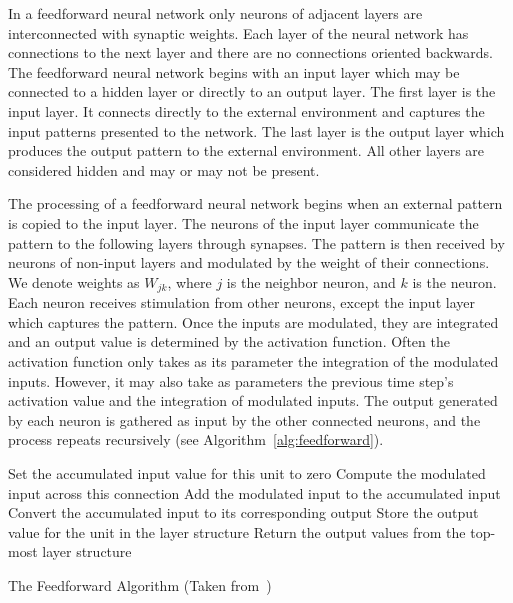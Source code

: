 \documentclass[11pt]{article}
\begin{document}
In a feedforward neural network only neurons of adjacent layers are interconnected with synaptic weights. Each layer of the neural
network has connections to the next layer and there are no connections oriented backwards. The feedforward neural network begins with an
input layer which may be connected to a hidden layer or directly to an output layer. The first layer is the input layer. It connects
directly to the external environment and captures the input patterns presented to the network. The last layer is the output layer which
produces the output pattern to the external environment. All other layers are considered hidden and may or may not be present.

The processing of a feedforward neural network begins when an external pattern is copied to the input layer. The neurons of the input
layer communicate the pattern to the following layers through synapses. The pattern is then received by neurons of non-input layers and
modulated by the weight of their connections. We denote weights as $W_{jk}$, where $j$ is the neighbor neuron, and $k$ is the neuron.
Each neuron receives stimulation from other neurons, except the input layer which captures the pattern. Once the inputs are modulated,
they are integrated and an output value is determined by the activation function. Often the activation function only takes as its
parameter the integration of the modulated inputs. However, it may also take as parameters the previous time step's activation value and
the integration of modulated inputs. The output generated by each neuron is gathered as input by the other connected neurons, and the
process repeats recursively (see Algorithm~\ref{alg:feedforward}).

\begin{algorithm}%
\dontprintsemicolon
{}
\SetLine
{}
{
	{
		Set the accumulated input value for this unit to zero\;
			{
				Compute the modulated input across this connection\;
				Add the modulated input to the accumulated input\;
			}
		Convert the accumulated input to its corresponding output\;
		Store the output value for the unit in the layer structure\;
	}
	Return the output values from the top-most layer structure\;
}

\caption{The Feedforward Algorithm (Taken from~\cite{skapura})}
\label{alg:feedforward}
\end{algorithm}
\end{document}
